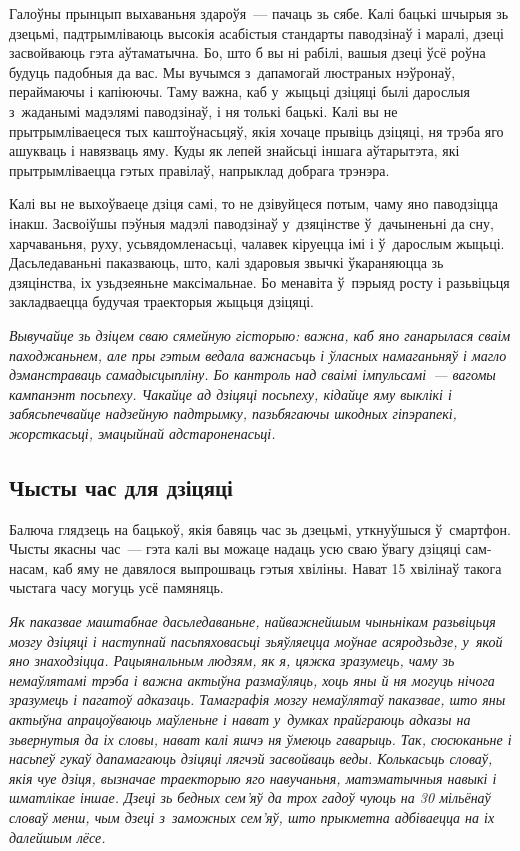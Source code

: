 Галоўны прынцып выхаваньня здароўя~--- пачаць зь сябе. Калі бацькі шчырыя зь дзецьмі, падтрымліваюць высокія асабістыя стандарты паводзінаў і маралі, дзеці засвойваюць гэта аўтаматычна. Бо, што б вы ні рабілі, вашыя дзеці ўсё роўна будуць падобныя да вас. Мы вучымся з~дапамогай люстраных нэўронаў, пераймаючы і капіюючы. Таму важна, каб у~жыцьці дзіцяці былі дарослыя з~жаданымі мадэлямі паводзінаў, і ня толькі бацькі. Калі вы не прытрымліваецеся тых каштоўнасьцяў, якія хочаце прывіць дзіцяці, ня трэба яго ашукваць і навязваць яму. Куды як лепей знайсьці іншага аўтарытэта, які прытрымліваецца гэтых правілаў, напрыклад добрага трэнэра.

Калі вы не выхоўваеце дзіця самі, то не дзівуйцеся потым, чаму яно паводзіцца інакш. Засвоіўшы пэўныя мадэлі паводзінаў у~дзяцінстве ў~дачыненьні да сну, харчаваньня, руху, усьвядомленасьці, чалавек кіруецца імі і ў~дарослым жыцьці. Дасьледаваньні паказваюць, што, калі здаровыя звычкі ўкараняюцца зь дзяцінства, іх узьдзеяньне максімальнае. Бо менавіта ў~пэрыяд росту і разьвіцьця закладваецца будучая траекторыя жыцьця дзіцяці.

\emph{Вывучайце зь дзіцем сваю сямейную гісторыю: важна, каб яно ганарылася сваім паходжаньнем, але пры гэтым ведала важнасьць і ўласных намаганьняў і магло дэманстраваць самадысцыпліну. Бо кантроль над сваімі імпульсамі~--- вагомы кампанэнт посьпеху. Чакайце ад дзіцяці посьпеху, кідайце яму выклікі і забясьпечвайце надзейную падтрымку, пазьбягаючы шкодных гіпэрапекі, жорсткасьці, эмацыйнай адстароненасьці.}

\subsection*{Чысты час для дзіцяці}

Балюча глядзець на бацькоў, якія бавяць час зь дзецьмі, уткнуўшыся ў~смартфон. Чысты якасны час~--- гэта калі вы можаце надаць усю сваю ўвагу дзіцяці сам-насам, каб яму не давялося выпрошваць гэтыя хвіліны. Нават 15 хвілінаў такога чыстага часу могуць усё памяняць.

\emph{Як паказвае маштабнае дасьледаваньне, найважнейшым чыньнікам разьвіцьця мозгу дзіцяці і наступнай пасьпяховасьці зьяўляецца моўнае асяродзьдзе, у~якой яно знаходзіцца. Рацыянальным людзям, як я, цяжка зразумець, чаму зь немаўлятамі трэба і важна актыўна размаўляць, хоць яны й ня могуць нічога зразумець і пагатоў адказаць. Тамаграфія мозгу немаўлятаў паказвае, што яны актыўна апрацоўваюць маўленьне і нават у~думках прайграюць адказы на зьвернутыя да іх словы, нават калі яшчэ ня ўмеюць гаварыць. Так, сюсюканьне і насьпеў гукаў дапамагаюць дзіцяці лягчэй засвойваць веды. Колькасьць словаў, якія чуе дзіця, вызначае траекторыю яго навучаньня, матэматычныя навыкі і шматлікае іншае. Дзеці зь бедных сем'яў да трох гадоў чуюць на 30 мільёнаў словаў менш, чым дзеці з~заможных сем'яў, што прыкметна адбіваецца на іх далейшым лёсе.}

